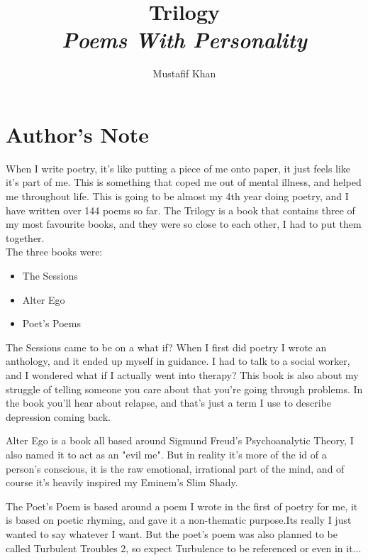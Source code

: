 \documentclass[12pt, b5paper, oneside]{book}
\title{Trilogy\\\textit{Poems With Personality}}
\author{Mustafif Khan}
\date{}
\begin{document}
\maketitle
{}
\newpage
\tableofcontents
\newpage
\section{Author's Note}
When I write poetry, it's like putting a piece of me onto paper, it just feels like it's part of me. This 
is something that coped me out of mental illness, and helped me throughout life. This is going to be almost 
my 4th year doing poetry, and I have written over 144 poems so far. The Trilogy is a book that contains three of my most 
favourite books, and they were so close to each other, I had to put them together. \\The three books were: 
\begin{itemize}
    \item The Sessions 
    \item Alter Ego
    \item Poet's Poems 
\end{itemize}
The Sessions came to be on a what if? When I first did poetry I wrote an anthology, and it ended up myself in guidance. I had to talk to a 
social worker, and I wondered what if I actually went into therapy? This book is also about my struggle of telling someone you 
care about that you're going through problems. In the book you'll hear about relapse, and that's just a term I use to describe depression coming back.
\par Alter Ego is a book all based around Sigmund Freud's Psychoanalytic Theory, I also named it  to act as an "evil me". But in reality it's more of the id of a person's conscious, it is the raw 
emotional, irrational part of the mind, and of course it's heavily inspired my Eminem's Slim Shady. 
\par The Poet's Poem is based around a poem I wrote in the first of poetry for me, it is based on poetic rhyming, 
and gave it a non-thematic purpose.Its really I just wanted to say whatever I want. But the poet's poem was also planned to be called 
Turbulent Troubles 2, so expect Turbulence to be referenced or even in it... 
\end{document}
